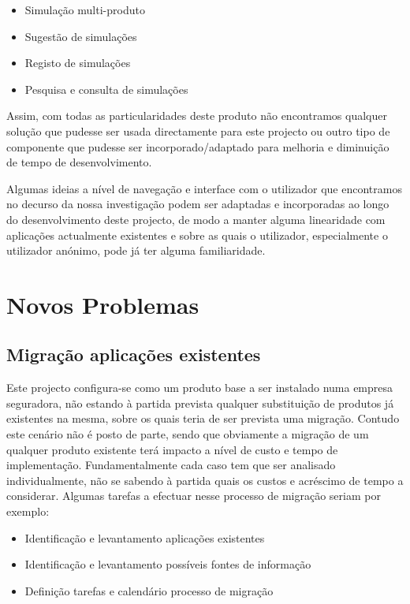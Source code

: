 \begin{itemize} 
\item Simulação multi-produto
\item Sugestão de simulações
\item Registo de simulações
\item Pesquisa e consulta de simulações
\end{itemize} 

Assim, com todas as particularidades deste produto não encontramos qualquer solução que pudesse ser usada directamente para este projecto ou outro tipo de componente que pudesse ser incorporado/adaptado para melhoria e diminuição de tempo de desenvolvimento.

Algumas ideias a nível de navegação e interface com o utilizador que encontramos no decurso da nossa investigação podem ser adaptadas e incorporadas ao longo do desenvolvimento deste projecto, de modo a manter alguma linearidade com aplicações actualmente existentes e sobre as quais o utilizador, especialmente o utilizador anónimo, pode já ter alguma familiaridade.

\section{Novos Problemas}
\subsection{Migração aplicações existentes}
Este projecto configura-se como um produto base a ser instalado numa empresa seguradora, não estando à partida prevista qualquer substituição de produtos já existentes na mesma, sobre os quais teria de ser prevista uma migração.
Contudo este cenário não é posto de parte, sendo que obviamente a migração de um qualquer produto existente terá impacto a nível de custo e tempo de implementação. Fundamentalmente cada caso tem que ser analisado individualmente, não se sabendo à partida quais os custos e acréscimo de tempo a considerar. Algumas tarefas a efectuar nesse processo de migração seriam por exemplo:

\begin{itemize} 
\item Identificação e levantamento aplicações existentes
\item Identificação e levantamento possíveis fontes de informação
\item Definição tarefas e calendário processo de migração
\end{itemize} 

